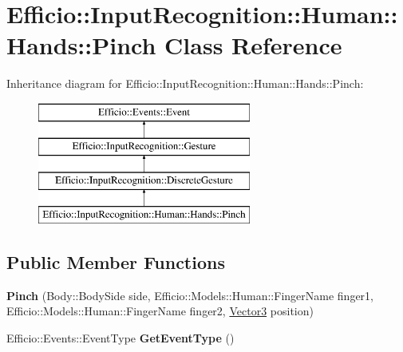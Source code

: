 \hypertarget{class_efficio_1_1_input_recognition_1_1_human_1_1_hands_1_1_pinch}{}\section{Efficio\+:\+:Input\+Recognition\+:\+:Human\+:\+:Hands\+:\+:Pinch Class Reference}
\label{class_efficio_1_1_input_recognition_1_1_human_1_1_hands_1_1_pinch}
Inheritance diagram for Efficio\+:\+:Input\+Recognition\+:\+:Human\+:\+:Hands\+:\+:Pinch\+:\begin{figure}[H]
\begin{center}
\leavevmode
\includegraphics[height=4.000000cm]{class_efficio_1_1_input_recognition_1_1_human_1_1_hands_1_1_pinch}
\end{center}
\end{figure}
\subsection*{Public Member Functions}
\begin{DoxyCompactItemize}
\item 
{\bfseries Pinch} (Body\+::\+Body\+Side side, Efficio\+::\+Models\+::\+Human\+::\+Finger\+Name finger1, Efficio\+::\+Models\+::\+Human\+::\+Finger\+Name finger2, \hyperlink{class_efficio_1_1_vector3}{Vector3} position)\hypertarget{class_efficio_1_1_input_recognition_1_1_human_1_1_hands_1_1_pinch_aec641f202abc86d61a42bbe49e420b68}{}\label{class_efficio_1_1_input_recognition_1_1_human_1_1_hands_1_1_pinch_aec641f202abc86d61a42bbe49e420b68}

\item 
Efficio\+::\+Events\+::\+Event\+Type {\bfseries Get\+Event\+Type} ()\hypertarget{class_efficio_1_1_input_recognition_1_1_human_1_1_hands_1_1_pinch_a579897e092310066f9dab8df222fc863}{}\label{class_efficio_1_1_input_recognition_1_1_human_1_1_hands_1_1_pinch_a579897e092310066f9dab8df222fc863}

\end{DoxyCompactItemize}
